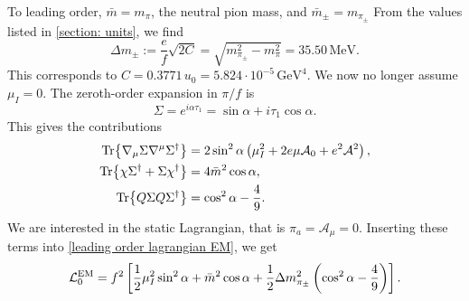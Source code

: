 To leading order, $\bar m = m_\pi$, the neutral pion mass, and $\bar m_{\pm} = m_{\pi_{\pm}}$
From the values listed in \autoref{section: units}, we find
%
\begin{equation}
    \label{EM mass contribtuion leading order}
    \Delta m_{\pm} := \frac{e}{f}\sqrt{2C} = \sqrt{m_{\pi_\pm}^2 - m_{\pi}^2} = 35.50 \, \text{MeV}.
\end{equation}
%
This corresponds to $C = 0.3771 \, u_0 = 5.824 \cdot 10^{-5} \, \text{GeV}^4$.
We now no longer assume $\mu_I = 0$.
The zeroth-order expansion in $\pi/f$ is
%
\begin{equation}
    \Sigma = e^{i \alpha \tau_1} = \sin \alpha + i \tau_1 \cos \alpha.
\end{equation}
%
This gives the contributions
%
\begin{align}
    \Tr{\nabla_\mu \Sigma \nabla^\mu \Sigma^\dagger}
    & = 2 \sin^2\alpha\left(\mu_I^2 + 2 e \mu \mathcal A_0 + e^2\mathcal A^2 \right), \\
    \Tr{\chi \Sigma^\dagger + \Sigma \chi^\dagger}
    & =4 \bar m^2 \cos \alpha,\\
    \Tr{Q \Sigma Q \Sigma^\dagger}
    & =  \cos^2 \alpha - \frac{4}{9}.
\end{align}
%
We are interested in the static Lagrangian, that is $\pi_a = \mathcal A_\mu = 0$.
Inserting these terms into \autoref{leading order lagrangian EM}, we get
%
\begin{equation}
    \label{static lagrangian with EM}
    \mathcal{L}_0^\text{EM}
    = f^2 \left[
        \frac{1}{2}\mu_I^2 \sin^2 \alpha + \bar m^2 \cos \alpha 
        + \frac{1}{2} \Delta m^2_{\pi_\pm} \left(\cos^2 \alpha - \frac{4}{9}\right)
    \right].
\end{equation}
%

